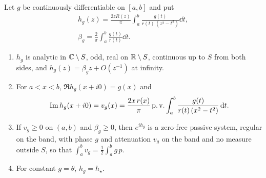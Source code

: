 \begin{proposition}\label{prop:profile}
Let $g$ be continuously differentiable on $[a,b]$ and put
\begin{gather*}
h_g(z)=\frac{2zR(z)}\pi\int_a^b\frac{g(t)}{r(t)\,(z^2-t^2)}\dd t,\\
\beta_g=\frac2\pi\int_a^b\frac{g(t)}{r(t)}\dd t .
\end{gather*}
\begin{enumerate}
\item[(i)] $h_g$ is analytic in $\mathbb C\setminus S$, odd, real on
$\mathbb R\setminus S$, continuous up to $S$ from both sides, and
$h_g(z)=\beta_gz+O(z^{-1})$ at infinity.
\item[(ii)] For $a<x<b$, $\Re h_g(x+i0)=g(x)$ and
\[
\operatorname{Im} h_g(x+i0)=v_g(x)=\frac{2x\,r(x)}\pi\operatorname{p.v.}\int_a^b\frac{g(t)}{r(t)\,(x^2-t^2)}\,\mathrm d t .
\]
\item[(iii)] If $v_g\ge0$ on $(a,b)$ and $\beta_g\ge0$, then $e^{ih_g}$ is a
zero-free passive system, regular on the band, with phase $g$ and
attenuation $v_g$ on the band and no measure outside $S$, so that
$\int_a^bv_g=\frac12\int_a^bg\,p$.
\item[(iv)] For constant $g=\theta$, $h_g=h_\star$.
\end{enumerate}
\end{proposition}


